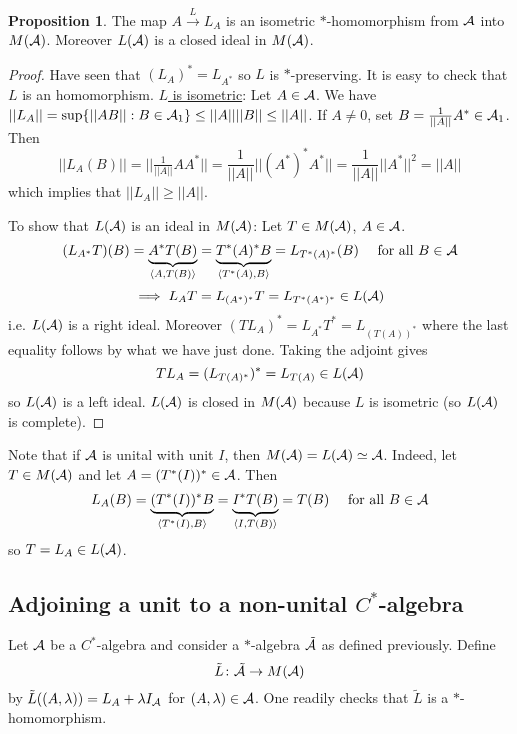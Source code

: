 \documentclass[10pt,english,a4paper]{article}
\theoremstyle{definition}
\newtheorem*{proposition}{Proposition}
\begin{document}
\begin{proposition}
    The map $A \overset{L}{\to} L_A$ is an isometric $*$-homomorphism from 
$\mathcal{A}$ into $M(\mathcal{A})$. Moreover $L(\mathcal{A})$ is a closed ideal in $M(\mathcal{A})$.
\end{proposition}

\begin{proof}
    
Have seen that $(L_A)^* = L_{A^*}$ so $L$ is $*$-preserving. It is easy to 
check that $L$ is an homomorphism. \ul{$L$ is isometric}: Let $A \in \mathcal{A}$.
We have $||L_A|| = \sup \{ ||AB|| : B \in \mathcal{A}_1  \} \leq ||A||||B|| \leq ||A||$.
If $A \neq 0$, set $B = \tfrac{1}{||A||}A^* \in \mathcal{A}_1$. Then 
\[
||L_A(B)|| = ||\tfrac{1}{||A||}AA^*|| = \frac{1}{||A||} ||(A^*)^*A^*|| = \frac{1}{||A||}
||A^*||^2 = ||A||
\]
which implies that $||L_A|| \geq ||A||$.

To show that $L(\mathcal{A})$ is an ideal in $M(\mathcal{A})$: Let $T \in M(\mathcal{A})$, $A \in \mathcal{A}$.
\[ 
(L_{A^*}T)(B) = \underbrace{A^*T(B)}_{\left\langle A,T(B) \right\rangle} = \underbrace{T^*(A)^*B}_{\left\langle T^*(A), B \right\rangle} = L_{T^*(A)^*} (B) \quad \text{ for all }B \in \mathcal{A}
\]
\[\implies L_A T = L_{(A^*)^*} T = L_{T^*(A^*)^*} \in L(\mathcal{A})   \]
i.e. $L(\mathcal{A})$ is a right ideal. Moreover $(TL_A)^* = L_{A^*}T^* = L_{(T(A))^*}$
where the last equality follows by what we have just done. 
Taking the adjoint gives
\[ TL_A = (L_{T(A)^*})^* = L_{T(A)}  \in L(\mathcal{A}) \]
so $L(\mathcal{A})$ is a left ideal. $L(\mathcal{A})$ is closed in $M(\mathcal{A})$ because $L$ is isometric 
(so $L(\mathcal{A})$ is complete).
\end{proof}

Note that if $\mathcal{A}$ is unital with unit $I$, then $M(\mathcal{A})= L(\mathcal{A}) \simeq \mathcal{A}$.
Indeed, let $T \in M(\mathcal{A})$ and let $A = (T^*(I))^* \in \mathcal{A}$. Then 
\begin{align*}
    L_{A}(B) = \underbrace{(T^*(I))^*B}_{\left\langle T^*(I), B \right\rangle} = \underbrace{I^*
T(B)}_{\left\langle I,T(B) \right\rangle}= T(B) \quad \text{ for all } B \in \mathcal{A}
\end{align*}
so $T = L_{A} \in L(\mathcal{A})$.

\subsection{Adjoining a unit to a non-unital $C^*$-algebra}
Let $\mathcal{A}$ be a $C^*$-algebra and consider a $*$-algebra $\tilde{\mathcal{A}}$ as 
defined previously. Define 
\[ \tilde{L}\colon \tilde{\mathcal{A}} \to M(\mathcal{A}) \]
by $\tilde{L}((A,\lambda)) = L_A + \lambda I_{\mathcal{A}}$ for $(A,\lambda) \in \mathcal{A}$.
One readily checks that $\tilde{L}$ is a $*$-homomorphism.
\end{document}
